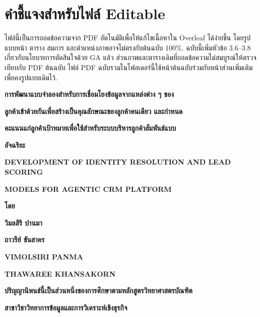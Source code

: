 \documentclass[12pt,a4paper]{report}
\begin{document}
\sloppy
\chapter*{คำชี้แจงสำหรับไฟล์ Editable}
ไฟล์นี้เป็นการถอดข้อความจาก PDF อัตโนมัติเพื่อให้แก้ไขเนื้อหาใน Overleaf ได้ง่ายขึ้น โดยรูปแบบหน้า ตาราง สมการ และตำแหน่งภาพอาจไม่ตรงกับต้นฉบับ 100\%. ฉบับนี้เพิ่มหัวข้อ 3.6--3.8 เกี่ยวกับนโยบายการตัดสินใจด้วย GA แล้ว ส่วนภาพและตารางเดิมที่ถอดข้อความไม่สมบูรณ์ให้ตรวจเทียบกับ PDF ต้นฉบับ ไฟล์ PDF ฉบับรวมในโฟลเดอร์นี้ใช้หน้าต้นฉบับร่วมกับหน้าส่วนเพิ่มเติมเพื่อคงรูปแบบเดิมไว้.
\clearpage
\begin{center}\bfseries การพัฒนาแบบจำลองสำหรับการเชื่อมโยงข้อมูลจากแหล่งต่าง ๆ ของ\end{center}
\begin{center}\bfseries ลูกค้าเข้าด้วยกันเพื่อสร้างเป็นคุณลักษณะของลูกค้าคนเดียว และกำหนด\end{center}
\begin{center}\bfseries คะแนนแก่ลูกค้าเป้าหมายเพื่อใช้สำหรับระบบบริหารลูกค้าสัมพันธ์แบบ\end{center}
\begin{center}\bfseries อัจฉริยะ\end{center}
\begin{center}\bfseries DEVELOPMENT OF IDENTITY RESOLUTION AND LEAD SCORING\end{center}
\begin{center}\bfseries MODELS FOR AGENTIC CRM PLATFORM\end{center}
\begin{center}\bfseries โดย\end{center}
\begin{center}\bfseries วิมลสิริ ปานมา\end{center}
\begin{center}\bfseries ถาวรีย์ ขันสาคร\end{center}
\begin{center}\bfseries VIMOLSIRI PANMA\end{center}
\begin{center}\bfseries THAWAREE KHANSAKORN\end{center}
\begin{center}\bfseries ปริญญานิพนธ์นี้เป็นส่วนหนึ่งของการศึกษาตามหลักสูตรวิทยาศาสตรบัณฑิต\end{center}
\begin{center}\bfseries สาขาวิชาวิทยาการข้อมูลและการวิเคราะห์เชิงธุรกิจ\end{center}
\end{document}
